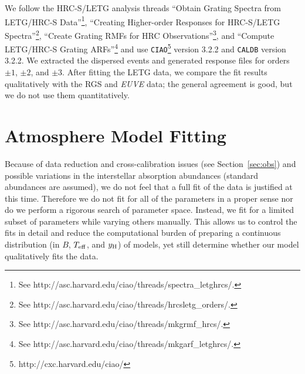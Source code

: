 \documentclass[useAMS,usegraphicx]{mn2e}
\newcommand{\ycol}{y_{\rm H}}
\newcommand{\teff}{\ensuremath{T_{\rm eff}}}
\begin{document}
We follow the HRC-S/LETG analysis threads ``Obtain
Grating Spectra from LETG/HRC-S Data''\footnote{See
http://asc.harvard.edu/ciao/threads/spectra\_letghrcs/.},
``Creating Higher-order Responses for HRC-S/LETG
Spectra''\footnote{See
http://asc.harvard.edu/ciao/threads/hrcsletg\_orders/.},
``Create Grating RMFs for HRC Observations''\footnote{See
http://asc.harvard.edu/ciao/threads/mkgrmf\_hrcs/.}, and
``Compute LETG/HRC-S Grating ARFs''\footnote{See
http://asc.harvard.edu/ciao/threads/mkgarf\_letghrcs/.} and
use \texttt{CIAO}\footnote{
http://cxc.harvard.edu/ciao/}
version 3.2.2 and \texttt{CALDB} version 3.2.2.
We extracted the dispersed events and generated response files for
orders $\pm 1$, $\pm 2$, and $\pm 3$.
After fitting the LETG data,
we compare the fit results qualitatively with the RGS and
\textit{EUVE} data; the general agreement is good, but we do not use
them quantitatively.

\section{Atmosphere Model Fitting}
\label{sec:atmfit}

Because of data reduction and cross-calibration issues (see
Section~\ref{sec:obs}) and possible variations in the interstellar
absorption abundances (standard abundances are assumed), we do not feel that
a full fit of the data is justified at this time.  Therefore we do not
fit for all of the parameters in a proper sense nor do we perform a
rigorous search of parameter space.  Instead, we fit for a limited
subset of parameters while varying others manually.  This allows us to
control the fits in detail and reduce the computational burden of
preparing a continuous distribution (in $B$, $\teff$, and $\ycol$)
of models, yet still determine whether our model qualitatively
fits the data.
 
\end{document}
